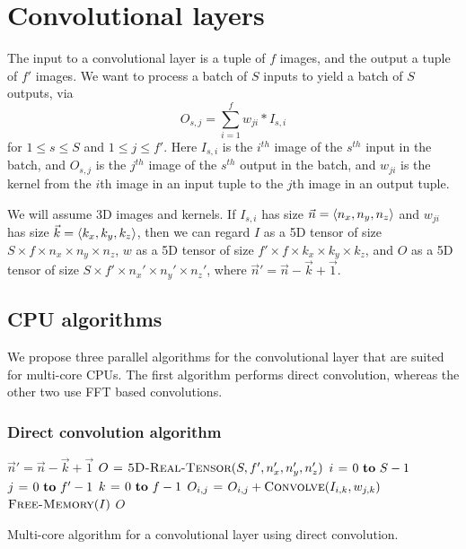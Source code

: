 \documentclass[conference]{./IEEEtran/IEEEtran}
\DeclarePairedDelimiter{\angled}{\langle}{\rangle}
\begin{document}
\section{Convolutional layers}
  The input to a convolutional layer is a tuple of $f$ images, and the
  output a tuple of $f'$ images.  We want to process a batch of $S$
  inputs to yield a batch of $S$ outputs, via
  $$O_{s,j} = \sum_{i=1}^f w_{ji}\ast I_{s,i}$$ for $1 \le s \le S$
  and $1 \le j \le f'$.  Here $I_{s,i}$ is the $i^{th}$ image of the
  $s^{th}$ input in the batch, and $O_{s,j}$ is the $j^{th}$ image of
  the $s^{th}$ output in the batch, and $w_{ji}$ is the kernel from
  the $i$th image in an input tuple to the $j$th image in an output
  tuple.

We will assume 3D images and kernels.  If $I_{s,i}$ has size $\vec{n}
= \angled{n_x, n_y, n_z}$ and $w_{ji}$ has size $\vec{k}
= \angled{k_x,k_y,k_z}$, then we can regard $I$ as a 5D tensor of size
$S \times f \times n_x \times n_y \times n_z$, $w$ as a 5D tensor of size
$f' \times f \times k_x \times k_y \times k_z$, and $O$ as a 5D tensor of
size $S \times f' \times n_x' \times n_y' \times n_z'$, where
$\vec{n}' = \vec{n} - \vec{k} + \vec{1}$.

\subsection{CPU algorithms}

  We propose three parallel algorithms for the convolutional layer
  that are suited for multi-core CPUs.  The first algorithm performs
  direct convolution, whereas the other two use FFT based
  convolutions.

\subsubsection{Direct convolution algorithm}

  \begin{algorithm}
    {\footnotesize
      \begin{codebox}
        \li $\vec{n}' = \vec{n} - \vec{k} + \vec{1}$
        \li $O \mathrel{\hspace{1pt}=\hspace{1pt}} \textnormal{\scshape5D-Real-Tensor}(S,f',n'_x,n'_y,n'_z)$
        \li {} $i \gets 0 \To S-1$
        \li   \Do {} $j \gets 0 \To f'-1$
        \li     \Do \For $k \gets 0 \To f-1$
        \li     \Do $O_{i,j} \mathrel{\hspace{1pt}=\hspace{1pt}} O_{i,j} + \textnormal{\scshape Convolve}(I_{i,k},w_{j,k})$
        \End \End \End
        \li $\textnormal{\scshape Free-Memory}(I)$
        \li \Return $O$
      \end{codebox}
    \caption{Multi-core algorithm for a convolutional layer using direct
      convolution.}
    \label{alg:cpu_direct}
    }
  \end{algorithm}
\end{document}
